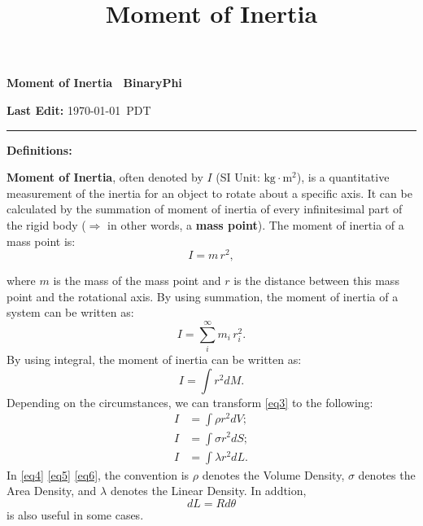 \documentclass[12pt]{scrartcl}
\title{Moment of Inertia}
\begin{document}
	\begin{center}
		\textbf{ \large Moment of Inertia \raisebox{0.5\depth}{\scalebox{0.8}\textcopyright}~BinaryPhi}
	\end{center}
	\vspace{-0.3em}
	\hspace{\fill} \textbf{Last Edit:} \today~PDT \vspace{-0.6em} \\
	\hrule

\vspace{3em}

{\selectfont
	\noindent \textbf{\large Definitions:}
}
\vspace{1em}

	\noindent \textbf{Moment of Inertia}, often denoted by $I$ (SI Unit: $\text{kg}\cdot\text{m}^2$), is a quantitative measurement of the inertia for an object to rotate about a specific axis. It can be calculated by the summation of moment of inertia of every infinitesimal part of the rigid body ($\Longrightarrow$ in other words, a \textbf{mass point}). The moment of inertia of a mass point is:
	\begin{equation} \label{eq1}
	I = m \hspace{2pt} r^2,
	\end{equation}

\noindent where $m$ is the mass of the mass point and $r$ is the distance between this mass point and the rotational axis. By using summation, the moment of inertia of a system can be written as:
	\begin{equation} \label{eq2}
	I = \sum_i^{\infty} m_i \hspace{2pt} r_i^2.
	\end{equation}
\newline
\noindent By using integral, the moment of inertia can be written as:
	\begin{equation} \label{eq3}
	I = \int r^2 dM.
	\end{equation}	
\newline
\noindent Depending on the circumstances, we can transform \eqref{eq3} to the following:
	\begin{align} 
	I &= \int \rho r^2 dV; \label{eq4} \\
	I &= \int \sigma r^2 dS; \label{eq5} \\
	I &= \int \lambda r^2 dL. \label{eq6}
	\end{align}
\newline
\noindent In \eqref{eq4} \eqref{eq5} \eqref{eq6}, the convention is $\rho$ denotes the Volume Density, $\sigma$ denotes the Area Density, and $\lambda$ denotes the Linear Density. In addtion, 
	$$dL = Rd\theta$$
is also useful in some cases.
\end{document}
